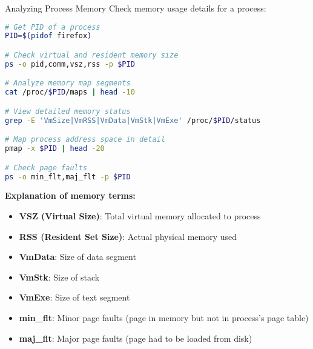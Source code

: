\begin{example2}{Analyzing Process Memory}
    Check memory usage details for a process:
    
\begin{lstlisting}[language=bash, style=basesmol]
# Get PID of a process
PID=$(pidof firefox)

# Check virtual and resident memory size
ps -o pid,comm,vsz,rss -p $PID

# Analyze memory map segments
cat /proc/$PID/maps | head -10

# View detailed memory status
grep -E 'VmSize|VmRSS|VmData|VmStk|VmExe' /proc/$PID/status

# Map process address space in detail
pmap -x $PID | head -20

# Check page faults
ps -o min_flt,maj_flt -p $PID
\end{lstlisting}

    \tcblower
    
    \textbf{Explanation of memory terms:}
    \begin{itemize}
        \item \textbf{VSZ (Virtual Size)}: Total virtual memory allocated to process
        \item \textbf{RSS (Resident Set Size)}: Actual physical memory used
        \item \textbf{VmData}: Size of data segment
        \item \textbf{VmStk}: Size of stack
        \item \textbf{VmExe}: Size of text segment
        \item \textbf{min\_flt}: Minor page faults (page in memory but not in process's page table)
        \item \textbf{maj\_flt}: Major page faults (page had to be loaded from disk)
    \end{itemize}
\end{example2}

